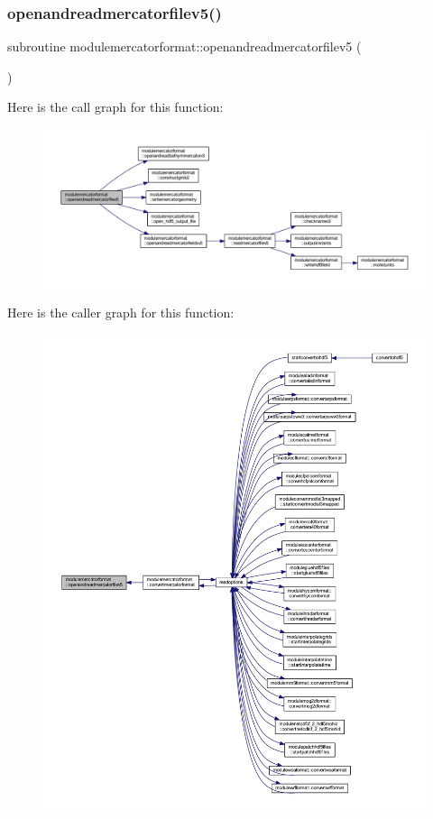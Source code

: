 \subsubsection{\texorpdfstring{openandreadmercatorfilev5()}{openandreadmercatorfilev5()}}
{\footnotesize\ttfamily subroutine modulemercatorformat\+::openandreadmercatorfilev5 (\begin{DoxyParamCaption}{ }\end{DoxyParamCaption})\hspace{0.3cm}{\ttfamily [private]}}

Here is the call graph for this function\+:\nopagebreak
\begin{figure}[H]
\begin{center}
\leavevmode
\includegraphics[width=350pt]{namespacemodulemercatorformat_a693845c08b34a8acfedbf088b2a06787_cgraph}
\end{center}
\end{figure}
Here is the caller graph for this function\+:\nopagebreak
\begin{figure}[H]
\begin{center}
\leavevmode
\includegraphics[width=350pt]{namespacemodulemercatorformat_a693845c08b34a8acfedbf088b2a06787_icgraph}
\end{center}
\end{figure}
